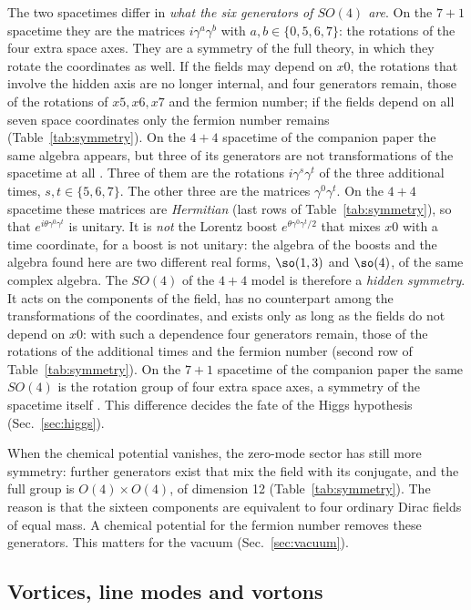 The two spacetimes differ in \emph{what the six generators of $SO(4)$ are}.
On the $7+1$ spacetime they are the matrices $i\gamma^a\gamma^b$ with $a,b\in\{0,5,6,7\}$: the
rotations of the four extra space axes. They are a symmetry of the full theory, in which they rotate
the coordinates as well. If the fields may depend on $x0$, the rotations that involve the hidden axis
are no longer internal, and four generators remain, those of the rotations of $x5,x6,x7$ and the
fermion number; if the fields depend on all seven space coordinates only the fermion number remains
(Table~\ref{tab:symmetry}). On the $4+4$ spacetime of the companion paper the same algebra appears,
but three of its generators are not transformations of the spacetime at all \cite{Companion1644}.
Three of them are the rotations $i\gamma^s\gamma^t$ of the three additional times, $s,t\in\{5,6,7\}$.
The other three are the matrices $\gamma^0\gamma^t$. On the $4+4$ spacetime these matrices are
\emph{Hermitian} (last rows of Table~\ref{tab:symmetry}), so that $e^{i\theta\gamma^0\gamma^t}$ is
unitary. It is \emph{not} the Lorentz boost $e^{\theta\gamma^0\gamma^t/2}$ that mixes $x0$ with a time
coordinate, for a boost is not unitary: the algebra of the boosts and the algebra found here are two
different real forms, $\so(1,3)$ and $\so(4)$, of the same complex algebra. The $SO(4)$ of the $4+4$
model is therefore a \emph{hidden symmetry}. It acts on the components of the field, has no
counterpart among the transformations of the coordinates, and exists only as long as the fields do not
depend on $x0$: with such a dependence four generators remain, those of the rotations of the
additional times and the fermion number (second row of Table~\ref{tab:symmetry}). On the $7+1$
spacetime of the companion paper the same $SO(4)$ is the rotation group of four extra space axes, a
symmetry of the spacetime itself \cite{Companion1671}. This difference decides the fate of the Higgs
hypothesis (Sec.~\ref{sec:higgs}).

When the chemical potential vanishes, the zero-mode sector has still more symmetry: further
generators exist that mix the field with its conjugate, and the full group is $O(4)\times O(4)$, of
dimension 12 (Table~\ref{tab:symmetry}). The reason is that the sixteen components are equivalent to
four ordinary Dirac fields of equal mass. A chemical potential for the fermion number removes these
generators. This matters for the vacuum (Sec.~\ref{sec:vacuum}).

\subsection{Vortices, line modes and vortons}
\label{sec:vortons}

